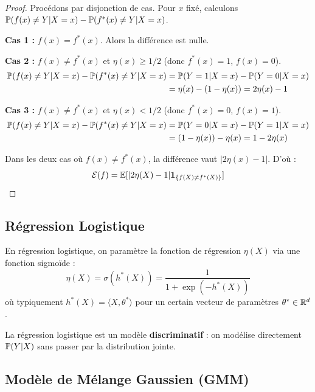 \begin{proof}
Procédons par disjonction de cas. Pour $x$ fixé, calculons $\mathbb{P}(f(x) \ne Y | X=x) - \mathbb{P}(f^*(x) \ne Y | X=x)$.

\textbf{Cas 1 :} $f(x) = f^*(x)$. Alors la différence est nulle.

\textbf{Cas 2 :} $f(x) \ne f^*(x)$ et $\eta(x) \ge 1/2$ (donc $f^*(x) = 1$, $f(x) = 0$).
\begin{align*}
\mathbb{P}(f(x) \ne Y | X=x) - \mathbb{P}(f^*(x) \ne Y | X=x) &= \mathbb{P}(Y=1|X=x) - \mathbb{P}(Y=0|X=x) \\
&= \eta(x) - (1-\eta(x)) = 2\eta(x) - 1
\end{align*}

\textbf{Cas 3 :} $f(x) \ne f^*(x)$ et $\eta(x) < 1/2$ (donc $f^*(x) = 0$, $f(x) = 1$).
\begin{align*}
\mathbb{P}(f(x) \ne Y | X=x) - \mathbb{P}(f^*(x) \ne Y | X=x) &= \mathbb{P}(Y=0|X=x) - \mathbb{P}(Y=1|X=x) \\
&= (1-\eta(x)) - \eta(x) = 1 - 2\eta(x)
\end{align*}

Dans les deux cas où $f(x) \ne f^*(x)$, la différence vaut $|2\eta(x) - 1|$. D'où :
\[
\mathcal{E}(f) = \mathbb{E}[|2\eta(X)-1|\mathbf{1}_{\{f(X)\ne f^{*}(X)\}}]
\]
\end{proof}

\subsection{Régression Logistique}

\begin{definition}
En régression logistique, on paramètre la fonction de régression $\eta(X)$ via une fonction sigmoïde :
\begin{equation}
\eta(X) = \sigma(h^*(X)) = \frac{1}{1 + \exp(-h^*(X))}
\end{equation}
où typiquement $h^*(X) = \langle X, \theta^* \rangle$ pour un certain vecteur de paramètres $\theta^* \in \mathbb{R}^d$.
\end{definition}

\begin{remarque}
La régression logistique est un modèle \textbf{discriminatif} : on modélise directement $\mathbb{P}(Y|X)$ sans passer par la distribution jointe.
\end{remarque}

\subsection{Modèle de Mélange Gaussien (GMM)}

